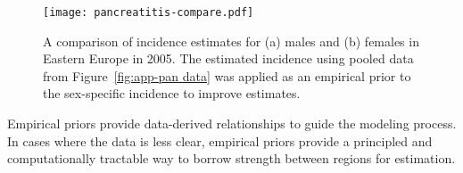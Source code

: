     \begin{figure}[h]
        \begin{center}
            \texttt{[image: pancreatitis-compare.pdf]}
            \caption{A comparison of incidence estimates for (a) males and
              (b) females in Eastern Europe in 2005.  The estimated incidence
              using pooled data from Figure~\ref{fig:app-pan data} was applied
              as an empirical prior to the sex-specific incidence to
              improve estimates.}
            \label{fig:app-pan compare}
        \end{center}
    \end{figure}

Empirical priors provide data-derived relationships to guide the
modeling process.  In cases where the data is less clear, empirical
priors provide a principled and computationally tractable way to
borrow strength between regions for estimation.
